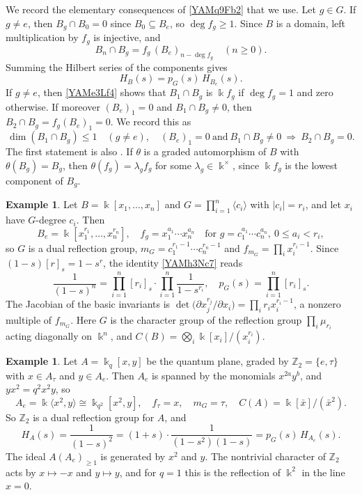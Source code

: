\documentclass[reqno]{amsart}
\numberwithin{equation}{section}
\theoremstyle{definition}
\newtheorem{example}[equation]{Example}
\theoremstyle{remark}
\theoremstyle{plain}
\newcommand{\kk}{\Bbbk}
\begin{document}
We record the elementary consequences of \eqref{YAMq9Fb2} that we use. Let $g\in G$. If $g\neq e$, then $B_g\cap B_0=0$ since $B_0\subseteq B_e$, so $\deg f_g\ge1$. Since $B$ is a domain, left multiplication by $f_g$ is injective, and
\begin{equation}\label{YAMe3Lf4}
B_n\cap B_g=f_g\,(B_e)_{n-\deg f_g}\quad(n\ge0).
\end{equation}
Summing the Hilbert series of the components gives
\begin{equation}\label{YAMh3Nc7}
H_B(s)=p_G(s)\,H_{B_e}(s).
\end{equation}
If $g\neq e$, then \eqref{YAMe3Lf4} shows that $B_1\cap B_g$ is $\kk f_g$ if $\deg f_g=1$ and zero otherwise. If moreover $(B_e)_1=0$ and $B_1\cap B_g\neq0$, then $B_2\cap B_g=f_g(B_e)_1=0$. We record this as
\begin{equation}\label{YAMe3Lf5}
\dim(B_1\cap B_g)\le1\quad(g\neq e),\quad (B_e)_1=0\ \text{and}\ B_1\cap B_g\neq0\ \Longrightarrow\ B_2\cap B_g=0.
\end{equation}
The first statement is also \cite[Theorems 0.3(2) and 3.5(3)]{KKZ}. If $\theta$ is a graded automorphism of $B$ with $\theta(B_g)=B_g$, then $\theta(f_g)=\lambda_gf_g$ for some $\lambda_g\in\kk^\times$, since $\kk f_g$ is the lowest component of $B_g$.

\begin{example}\label{YAMex1Cm4}
Let $B=\kk[x_1,\dots,x_n]$ and $G=\prod_{i=1}^n\langle c_i\rangle$ with $|c_i|=r_i$, and let $x_i$ have $G$-degree $c_i$. Then
\[
B_e=\kk[x_1^{r_1},\dots,x_n^{r_n}],\quad f_g=x_1^{a_1}\cdots x_n^{a_n}\quad\text{for }g=c_1^{a_1}\cdots c_n^{a_n},\ 0\le a_i<r_i,
\]
so $G$ is a dual reflection group, $m_G=c_1^{r_1-1}\cdots c_n^{r_n-1}$ and $f_{m_G}=\prod_ix_i^{r_i-1}$. Since $(1-s)[r]_s=1-s^r$, the identity \eqref{YAMh3Nc7} reads
\[
\frac{1}{(1-s)^n}=\prod_{i=1}^n[r_i]_s\cdot\prod_{i=1}^n\frac{1}{1-s^{r_i}},\quad p_G(s)=\prod_{i=1}^n[r_i]_s.
\]
The Jacobian of the basic invariants is $\det\big(\partial x_j^{r_j}/\partial x_i\big)=\prod_ir_ix_i^{r_i-1}$, a nonzero multiple of $f_{m_G}$. Here $G$ is the character group of the reflection group $\prod_i\mu_{r_i}$ acting diagonally on $\kk^n$, and $C(B)=\bigotimes_i\kk[x_i]/(x_i^{r_i})$.
\end{example}

\begin{example}\label{YAMex8Qv2}
Let $A=\kk_q[x,y]$ be the quantum plane, graded by $\mathbb Z_2=\{e,\tau\}$ with $x\in A_\tau$ and $y\in A_e$. Then $A_e$ is spanned by the monomials $x^{2a}y^b$, and $yx^2=q^2x^2y$, so
\[
A_e=\kk\langle x^2,y\rangle\cong\kk_{q^2}[x^2,y],\quad f_\tau=x,\quad m_G=\tau,\quad C(A)=\kk[\bar x]/(\bar x^2).
\]
So $\mathbb Z_2$ is a dual reflection group for $A$, and
\[
H_A(s)=\frac{1}{(1-s)^2}=(1+s)\cdot\frac{1}{(1-s^2)(1-s)}=p_G(s)\,H_{A_e}(s).
\]
The ideal $A(A_e)_{\ge1}$ is generated by $x^2$ and $y$. The nontrivial character of $\mathbb Z_2$ acts by $x\mapsto-x$ and $y\mapsto y$, and for $q=1$ this is the reflection of $\kk^2$ in the line $x=0$.
\end{example}
\end{document}
